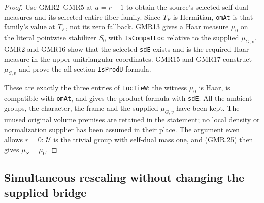 \documentclass[11pt,a4paper]{article}
\numberwithin{equation}{section}
\theoremstyle{remark}\newtheorem{remark}[theorem]{Remark}
\begin{document}
\begin{proof}
Use GMR2--GMR5 at $a=r+1$ to obtain the source's selected self-dual
measures and its selected entire fiber family.  Since $T_F$ is
Hermitian, \texttt{om\allowbreak At} is that family's value at $T_F$, not its
zero fallback.  GMR13 gives a Haar measure $\mu_0$ on the literal
pointwise stabilizer $S_0$ with \texttt{Is\allowbreak Compat\allowbreak Loc} relative to the
supplied $\mu_{G,v}$.  GMR2 and GMR16 show that the selected
\texttt{sd\allowbreak E} exists and is the required Haar measure in the
upper-unitriangular coordinates.  GMR15 and GMR17 construct $\mu_{S,v}$
and prove the all-section \texttt{Is\allowbreak Prod\allowbreak U} formula.

These are exactly the three entries of \texttt{Loc\allowbreak Tie\allowbreak W}: the witness
$\mu_0$ is Haar, is compatible with \texttt{om\allowbreak At}, and gives the
product formula with \texttt{sd\allowbreak E}.  All the ambient groups, the
character, the frame and the supplied $\mu_{G,v}$ have been kept.
The unused original volume premises are retained in the statement;
no local density or normalization supplier has been assumed in their
place.  The argument even allows $r=0$: $\mathcal U$ is the trivial
group with self-dual mass one, and (GMR.25) then gives
$\mu_S=\mu_0$.
\end{proof}

\subsection{Simultaneous rescaling without changing the supplied bridge}

\end{document}
